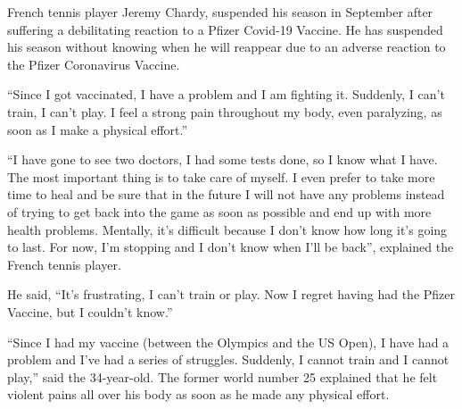 French tennis player Jeremy Chardy, suspended his season in September after
suffering a debilitating reaction to a Pfizer Covid-19 Vaccine. He has suspended
his season without knowing when he will reappear due to an adverse reaction to
the Pfizer Coronavirus Vaccine.

“Since I got vaccinated, I have a problem and I am fighting it. Suddenly, I
can’t train, I can’t play. I feel a strong pain throughout my body, even
paralyzing, as soon as I make a physical effort.”

“I have gone to see two doctors, I had some tests done, so I know what I
have. The most important thing is to take care of myself. I even prefer to take
more time to heal and be sure that in the future I will not have any problems
instead of trying to get back into the game as soon as possible and end up with
more health problems. Mentally, it’s difficult because I don’t know how long
it’s going to last. For now, I’m stopping and I don’t know when I’ll be back”,
explained the French tennis player.

He said, “It’s frustrating, I can’t train or play. Now I regret having had the
Pfizer Vaccine, but I couldn’t know.”

“Since I had my vaccine (between the Olympics and the US Open), I have had a
problem and I’ve had a series of struggles. Suddenly, I cannot train and I
cannot play,” said the 34-year-old. The former world number 25 explained that he
felt violent pains all over his body as soon as he made any physical effort.
